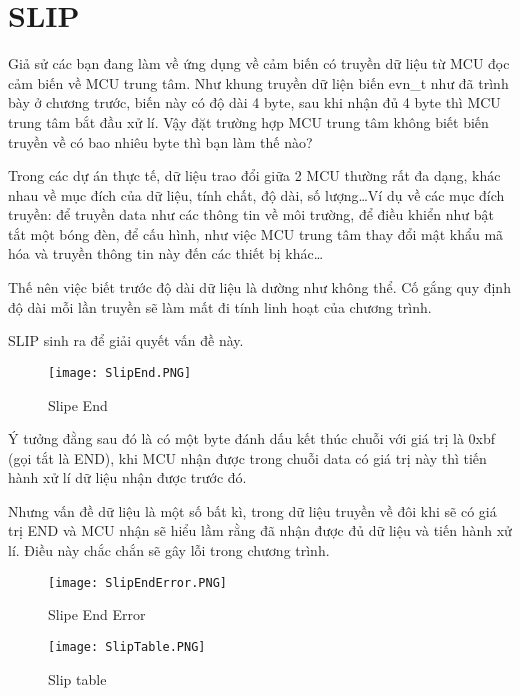 \newpage
\section{SLIP}

Giả sử các bạn đang làm về ứng dụng về cảm biến có truyền dữ liệu từ MCU đọc cảm biến về MCU trung tâm. Như khung truyền dữ liện biến evn\_t như đã trình bày ở chương trước, biến này có độ dài 4 byte, sau khi nhận đủ 4 byte thì MCU trung tâm bắt đầu xử lí. Vậy đặt trường hợp MCU trung tâm không biết biến truyền về có bao nhiêu byte thì bạn làm thế nào?

Trong các dự án thực tế, dữ liệu trao đổi giữa 2 MCU thường rất đa dạng, khác nhau về mục đích của dữ liệu, tính chất, độ dài, số lượng\dots Ví dụ về các mục đích truyền: để truyền data như các thông tin về môi trường, để điều khiển như bật tắt một bóng đèn, để cấu hình, như việc MCU trung tâm thay đổi mật khẩu mã hóa và truyền thông tin này đến các thiết bị khác\dots

Thế nên việc biết trước độ dài dữ liệu là dường như không thể. Cố gắng quy định độ dài mỗi lần truyền sẽ làm mất đi tính linh hoạt của chương trình. 

SLIP sinh ra để giải quyết vấn đề này.

\begin{wrapfigure}{l}{0.5\textwidth}
	\centering
    \texttt{[image: SlipEnd.PNG]}
\caption{Slipe End}
\end{wrapfigure}

Ý tưởng đằng sau đó là có một byte đánh dấu kết thúc chuỗi với giá trị là 0xbf (gọi tắt là END), khi MCU nhận được trong chuỗi data có giá trị này thì tiến hành xử lí dữ liệu nhận được trước đó.

Nhưng vấn đề dữ liệu là một số bất kì, trong dữ liệu truyền về đôi khi sẽ có giá trị END và MCU nhận sẽ hiểu lầm rằng đã nhận được đủ dữ liệu và tiến hành xử lí. Điều này chắc chắn sẽ gây lỗi trong chương trình.

\begin{wrapfigure}{l}{0.5\textwidth}
	\centering
    \texttt{[image: SlipEndError.PNG]}
\caption{Slipe End Error}
\end{wrapfigure}

\begin{wrapfigure}{l}{0.5\textwidth}
	\centering
    \texttt{[image: SlipTable.PNG]}
    \caption{Slip table}
    \label{SlipTable}
\end{wrapfigure}


